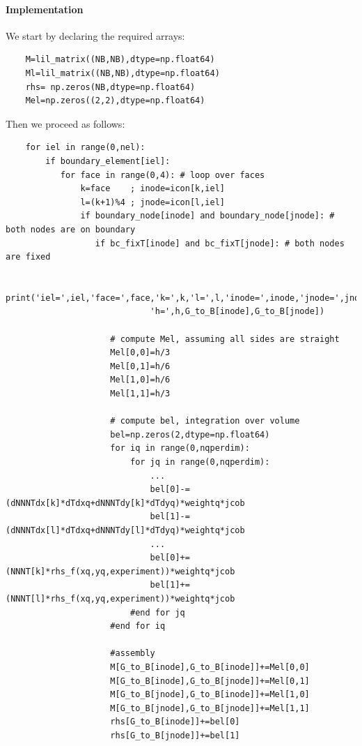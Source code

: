 \paragraph{Implementation} We start by declaring the required arrays:
\begin{lstlisting}
    M=lil_matrix((NB,NB),dtype=np.float64)
    Ml=lil_matrix((NB,NB),dtype=np.float64)
    rhs= np.zeros(NB,dtype=np.float64)   
    Mel=np.zeros((2,2),dtype=np.float64) 
\end{lstlisting}

Then we proceed as follows:

\begin{lstlisting}
    for iel in range(0,nel):
        if boundary_element[iel]:
           for face in range(0,4): # loop over faces
               k=face    ; inode=icon[k,iel]
               l=(k+1)%4 ; jnode=icon[l,iel]
               if boundary_node[inode] and boundary_node[jnode]: # both nodes are on boundary
                  if bc_fixT[inode] and bc_fixT[jnode]: # both nodes are fixed

                     print('iel=',iel,'face=',face,'k=',k,'l=',l,'inode=',inode,'jnode=',jnode,
                             'h=',h,G_to_B[inode],G_to_B[jnode])

                     # compute Mel, assuming all sides are straight
                     Mel[0,0]=h/3  
                     Mel[0,1]=h/6  
                     Mel[1,0]=h/6  
                     Mel[1,1]=h/3  

                     # compute bel, integration over volume
                     bel=np.zeros(2,dtype=np.float64) 
                     for iq in range(0,nqperdim):
                         for jq in range(0,nqperdim):
                             ...
                             bel[0]-=(dNNNTdx[k]*dTdxq+dNNNTdy[k]*dTdyq)*weightq*jcob
                             bel[1]-=(dNNNTdx[l]*dTdxq+dNNNTdy[l]*dTdyq)*weightq*jcob
                             ...
                             bel[0]+=(NNNT[k]*rhs_f(xq,yq,experiment))*weightq*jcob
                             bel[1]+=(NNNT[l]*rhs_f(xq,yq,experiment))*weightq*jcob
                         #end for jq
                     #end for iq

                     #assembly                                          
                     M[G_to_B[inode],G_to_B[inode]]+=Mel[0,0]
                     M[G_to_B[inode],G_to_B[jnode]]+=Mel[0,1]
                     M[G_to_B[jnode],G_to_B[inode]]+=Mel[1,0]
                     M[G_to_B[jnode],G_to_B[jnode]]+=Mel[1,1]
                     rhs[G_to_B[inode]]+=bel[0]
                     rhs[G_to_B[jnode]]+=bel[1]

\end{lstlisting}


